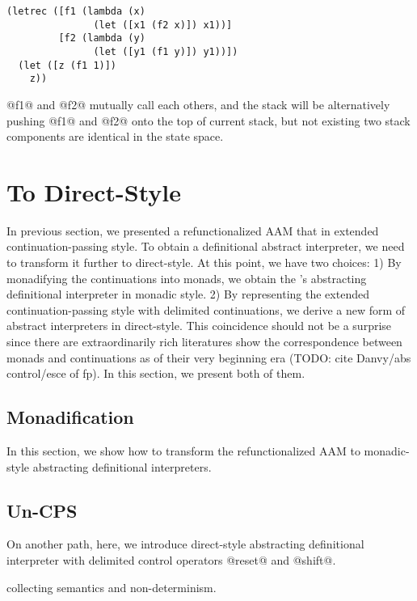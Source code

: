 \documentclass[acmsmall,review,anonymous]{acmart}\settopmatter{printfolios=true,printccs=false,printacmref=false}
\begin{document}
\begin{lstlisting}
(letrec ([f1 (lambda (x) 
               (let ([x1 (f2 x)]) x1))]
         [f2 (lambda (y)
               (let ([y1 (f1 y)]) y1))])
  (let ([z (f1 1)])
    z))
\end{lstlisting}

@f1@ and @f2@ mutually call each others, and the stack will be alternatively
pushing @f1@ and @f2@ onto the top of current stack, but not existing 
two stack components are identical in the state space.

\section{To Direct-Style}

In previous section, we presented a refunctionalized AAM that in extended continuation-passing style. 
To obtain a definitional abstract interpreter, we need to transform it further to direct-style. 
At this point, we have two choices: 
1) By monadifying the continuations into monads, we obtain the \citeauthor{darais2017abstracting}'s 
abstracting definitional interpreter in monadic style.
2) By representing the extended continuation-passing style with delimited continuations,
we derive a new form of abstract interpreters in direct-style.
This coincidence should not be a surprise since there are extraordinarily rich literatures 
show the correspondence between monads and continuations as of their very beginning era
(TODO: cite Danvy/abs control/esce of fp).
In this section, we present both of them.

\subsection{Monadification} \label{monadify}

In this section, we show how to transform the refunctionalized AAM to monadic-style
abstracting definitional interpreters.

\subsection{Un-CPS} \label{uncps}

On another path, here, we introduce direct-style abstracting definitional interpreter 
with delimited control operators @reset@ and @shift@.

collecting semantics and non-determinism.
\end{document}

